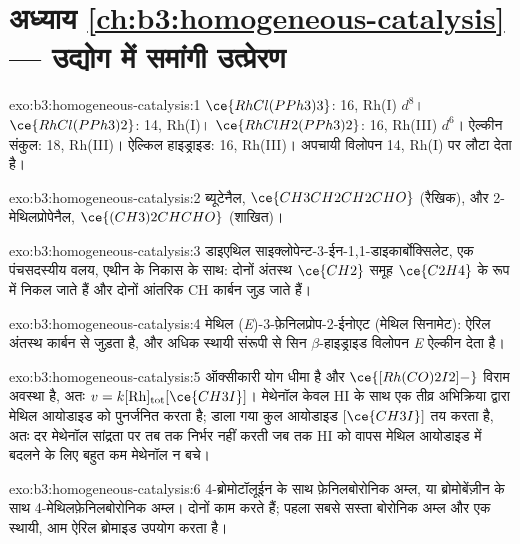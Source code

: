 \section*{अध्याय \ref{ch:b3:homogeneous-catalysis} --- उद्योग में समांगी उत्प्रेरण}

\begin{solution}{exo:b3:homogeneous-catalysis:1}
$\ce{RhCl(PPh3)3}$: 16, Rh(I) $d^8$। $\ce{RhCl(PPh3)2}$: 14, Rh(I)। $\ce{RhClH2(PPh3)2}$: 16, Rh(III) $d^6$।
ऐल्कीन संकुल: 18, Rh(III)। ऐल्किल हाइड्राइड: 16, Rh(III)। अपचायी विलोपन
14, Rh(I) पर लौटा देता है।
\end{solution}

\begin{solution}{exo:b3:homogeneous-catalysis:2}
ब्यूटेनैल, $\ce{CH3CH2CH2CHO}$ (रैखिक), और 2-मेथिलप्रोपेनैल, $\ce{(CH3)2CHCHO}$ (शाखित)।
\end{solution}

\begin{solution}{exo:b3:homogeneous-catalysis:3}
डाइएथिल साइक्लोपेन्ट-3-ईन-1,1-डाइकार्बोक्सिलेट, एक पंचसदस्यीय वलय, एथीन के
निकास के साथ: दोनों अंतस्थ $\ce{CH2}$ समूह $\ce{C2H4}$ के रूप में निकल जाते हैं और दोनों आंतरिक CH कार्बन
जुड़ जाते हैं।
\end{solution}

\begin{solution}{exo:b3:homogeneous-catalysis:4}
मेथिल (\textit{E})-3-फ़ेनिलप्रोप-2-ईनोएट (मेथिल सिनामेट): ऐरिल
अंतस्थ कार्बन से जुड़ता है, और अधिक स्थायी संरूपी से सिन $\beta$-हाइड्राइड विलोपन
\textit{E} ऐल्कीन देता है।
\end{solution}

\begin{solution}{exo:b3:homogeneous-catalysis:5}
ऑक्सीकारी योग धीमा है और $\ce{[Rh(CO)2I2]-}$ विराम अवस्था है, अतः
$v = k[\mathrm{Rh}]_{\mathrm{tot}}[\ce{CH3I}]$। मेथेनॉल केवल HI के साथ एक तीव्र अभिक्रिया द्वारा मेथिल आयोडाइड को पुनर्जनित करता है;
डाला गया कुल आयोडाइड $[\ce{CH3I}]$ तय करता है, अतः दर मेथेनॉल
सांद्रता पर तब तक निर्भर नहीं करती जब तक HI को वापस मेथिल आयोडाइड में बदलने के लिए
बहुत कम मेथेनॉल न बचे।
\end{solution}

\begin{solution}{exo:b3:homogeneous-catalysis:6}
4-ब्रोमोटॉलूईन के साथ फ़ेनिलबोरोनिक अम्ल, या ब्रोमोबेंज़ीन के साथ
4-मेथिलफ़ेनिलबोरोनिक अम्ल। दोनों काम करते हैं; पहला सबसे सस्ता बोरोनिक अम्ल और एक स्थायी,
आम ऐरिल ब्रोमाइड उपयोग करता है।
\end{solution}

